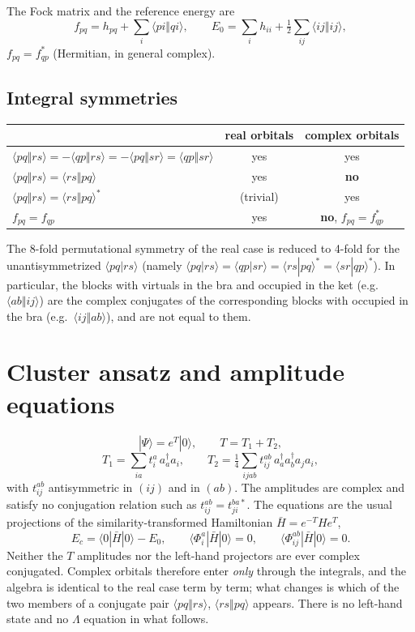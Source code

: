 \documentclass[11pt]{article}
\newcommand{\bra}[1]{\langle #1|}
\newcommand{\ket}[1]{|#1\rangle}
\newcommand{\anti}[4]{\langle #1#2\Vert #3#4\rangle}
\newcommand{\dir}[4]{\langle #1#2|#3#4\rangle}
\begin{document}
The Fock matrix and the reference energy are
\begin{equation}
f_{pq}=h_{pq}+\sum_i\anti{p}{i}{q}{i},\qquad
E_0=\sum_i h_{ii}+\tfrac12\sum_{ij}\anti{i}{j}{i}{j},
\end{equation}
$f_{pq}=f_{qp}^*$ (Hermitian, in general complex).

\subsection*{Integral symmetries}

\begin{center}
\begin{tabular}{lcc}
 & real orbitals & complex orbitals\\ \hline
$\anti{p}{q}{r}{s}=-\anti{q}{p}{r}{s}=-\anti{p}{q}{s}{r}=\anti{q}{p}{s}{r}$ & yes & yes\\
$\anti{p}{q}{r}{s}=\anti{r}{s}{p}{q}$ & yes & \textbf{no}\\
$\anti{p}{q}{r}{s}=\anti{r}{s}{p}{q}^{*}$ & (trivial) & yes\\
$f_{pq}=f_{qp}$ & yes & \textbf{no}, $f_{pq}=f_{qp}^*$\\
\end{tabular}
\end{center}
The 8-fold permutational symmetry of the real case is reduced to 4-fold for the
unantisymmetrized $\dir{p}{q}{r}{s}$ (namely
$\dir{p}{q}{r}{s}=\dir{q}{p}{s}{r}=\dir{r}{s}{p}{q}^*=\dir{s}{r}{q}{p}^*$).
In particular, the blocks with virtuals in the bra and occupied in the ket
(e.g.\ $\anti{a}{b}{i}{j}$) are the complex conjugates of the corresponding
blocks with occupied in the bra (e.g.\ $\anti{i}{j}{a}{b}$), and are not equal
to them.

\section{Cluster ansatz and amplitude equations}

\begin{equation}
\ket{\Psi}=e^{T}\ket{0},\qquad T=T_1+T_2,
\end{equation}
\begin{equation}
T_1=\sum_{ia}t_i^a\,a_a^\dagger a_i,\qquad
T_2=\tfrac14\sum_{ijab}t_{ij}^{ab}\,a_a^\dagger a_b^\dagger a_j a_i ,
\end{equation}
with $t_{ij}^{ab}$ antisymmetric in $(ij)$ and in $(ab)$. The amplitudes are
complex and satisfy no conjugation relation such as
$t_{ij}^{ab}=t_{ji}^{ba*}$. The equations are the usual projections of the
similarity-transformed Hamiltonian $\bar H=e^{-T}He^{T}$,
\begin{equation}
E_c=\bra{0}\bar H\ket{0}-E_0,\qquad
\bra{\Phi_i^a}\bar H\ket{0}=0,\qquad
\bra{\Phi_{ij}^{ab}}\bar H\ket{0}=0 .
\end{equation}
Neither the $T$ amplitudes nor the left-hand projectors are ever complex
conjugated. Complex orbitals therefore enter \emph{only} through the
integrals, and the algebra is identical to the real case term by term; what
changes is which of the two members of a conjugate pair
$\anti{p}{q}{r}{s}$, $\anti{r}{s}{p}{q}$ appears. There is no left-hand
state and no $\Lambda$ equation in what follows.
\end{document}
